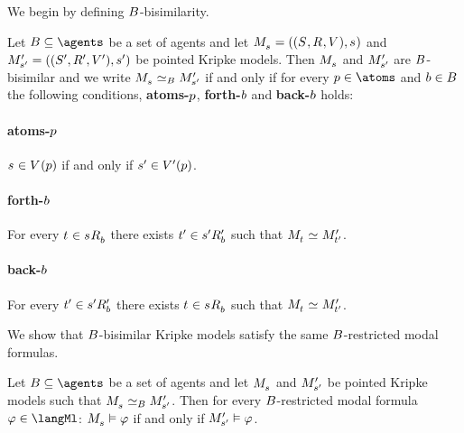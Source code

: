 We begin by defining $B$-bisimilarity.

\begin{definition}
Let $\agentsB \subseteq \agents$ be a set of agents and let $\kPModelAndTuple{\kStateS}$ and $\kPModelAndTupleP{\kStateSP}$ be pointed Kripke models.
Then $\kPModel{\kStateS}$ and ${M^{\prime}_{{s}^{\prime}}}$ are $B$-bisimilar and we write $\kPModel{\kStateS} \bisimilar[\agentsB] \kPModelP{\kStateSP}$ if and only if for every $\atomP \in \atoms$ and $b \in B$ the following conditions, {\bf atoms-$p$}, {\bf forth-$b$} and {\bf back-$b$} holds:

\paragraph{atoms-$p$}
$\kStateS \in \kValuation(\atomP)$ if and only if ${s}^{\prime} \in {V^{\prime}}(p)$.

\paragraph{forth-$b$}
For every $\kStateT \in \kSuccessorsB{\kStateS}$ there exists ${t}^{\prime} \in {{s}^{\prime}} {R^{\prime}_{b}}$ such that $\kPModel{\kStateT} \bisimilar \kPModelP{\kStateTP}$.

\paragraph{back-$b$}
For every ${t}^{\prime} \in {{s}^{\prime}} {R^{\prime}_{b}}$ there exists $\kStateT \in \kSuccessorsB{\kStateS}$ such that $\kPModel{\kStateT} \bisimilar \kPModelP{\kStateTP}$.
\end{definition}

We show that $B$-bisimilar Kripke models satisfy the same $B$-restricted modal formulas.

\begin{lemma}\label{b-restricted-invariance}
Let $\agentsB \subseteq \agents$ be a set of agents and let $\kPModel{\kStateS}$ and ${M^{\prime}_{{s}^{\prime}}}$ be pointed Kripke models such that $\kPModel{\kStateS} \bisimilar[\agentsB] \kPModelP{\kStateSP}$.
Then for every $B$-restricted modal formula $\phi \in \langMl$:
$\kPModel{\kStateS} \entails \phi$ if and only if ${M^{\prime}_{{s}^{\prime}}} \vDash \varphi$.
\end{lemma}

